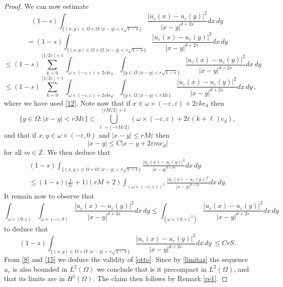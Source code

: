 \documentclass{article}
\newcommand{\e}{\varepsilon}
\begin{document}
\begin{proof}
We can now estimate 
$$
(1-s)\int_{\{(x,y)\in \Omega\times\Omega:|x-y|<r\sqrt{1-s}\}} \frac{|u_\e(x)-u_\e(y)|^2}{|x-y|^{d+2s}} dx\,dy\,
$$
$$
=(1-s)\int_{\{(x,y)\in \Omega\times\Omega:|x-y|<r\sqrt{1-s}\}} \frac{|u_\e(x)-u_\e(y)|^2}{|x-y|^{d+2s}} dx\,dy\,
$$
$$
\le(1-s)\sum_{k=0}^{\lfloor1/2\e\rfloor+1}\int_{\omega\times(-\e,\e)+2\e k e_d}
\int_{\{y\in\Omega:|x-y|<r\sqrt{1-s}\}} \frac{|u_\e(x)-u_\e(y)|^2}{|x-y|^{d+2s}} dx\,dy\,
$$
$$
\le(1-s)\sum_{k=0}^{\lfloor1/2\e\rfloor+1}\int_{\omega\times(-\e,\e)+2\e k e_d}
\int_{\{y\in\Omega:|x-y|<rM\e\}} \frac{|u_\e(x)-u_\e(y)|^2}{|x-y|^{d+2s}} dx\,dy\,,
$$
where we have used \eqref{12}. Note now that if $x\in \omega\times(-\e,\e)+2\e k e_d$ then
$$
\{y\in\Omega:|x-y|<rM\e\}\subset \bigcup_{\ell=\lfloor -rM/2\rfloor}^{\lfloor rM/2\rfloor+1}( \omega\times(-\e,\e)+2\e (k+\ell) e_d),
$$
and that {%
if $x,y\in \omega\times(-\e,0)$ and $|x-y|\le rM\e$ then 
$$
|x-y|\le C|x-y+2\e m e_d|
$$
for all $m\in\mathbb Z$.} We then deduce that
\begin{eqnarray*}\nonumber
(1-s)\int_{\{(x,y)\in \Omega\times\Omega:|x-y|<r\sqrt{1-s}\}} 
\frac{|u_\e(x)-u_\e(y)|^2}{|x-y|^{d+2s}} dx\,dy\,
\\ \nonumber
\le(1-s)\Big(\frac1{2\e}+1\Big) (rM+2)\int_{(\omega\times(-\e,\e))^2}
\frac{|u_\e(x)-u_\e(y)|^2}{|x-y|^{d+2s}} dx\,dy.
\end{eqnarray*}
It remain now to observe that
$$
\int_{\omega\times(0,\e)}\int_{\omega\times(-\e,0)}\frac{|u_\e(x)-u_\e(y)|^2}{|x-y|^{d+2s}} dx\,dy
\le \int_{(\omega\times(0,\e)^2)}\frac{|u_\e(x)-u_\e(y)|^2}{|x-y|^{d+2s}} dx\,dy
$$
to deduce that
\begin{equation}\label{15}
(1-s)\int_{\{(x,y)\in \Omega\times\Omega:|x-y|<r\sqrt{1-s}\}} 
\frac{|u_\e(x)-u_\e(y)|^2}{|x-y|^{d+2s}} dx\,dy\,\le CrS.
\end{equation}
From \eqref{8} and \eqref{15} we deduce the validity of \eqref{otto}. Since by \eqref{limitaz} the sequence $u_\e$ is also bounded in $L^2(\Omega)$ we conclude that is it precompact in $L^2(\Omega)$, and that its limits are in $H^1(\Omega)$. The claim then follows by Remark \ref{re1}.
\end{proof} 
\end{document}

